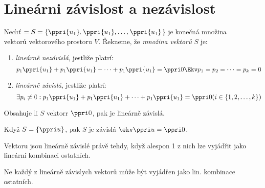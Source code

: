 
\let\braceru=\relax \let\bracelu=\relax 
\def\o#1{\setbox0=
	\hbox{$\kern2pt\overbrace{\kern-2pt#1\kern-2pt}\kern2pt$}\ht0=2.1ex\box0}
\def\to#1{\hbox{#1\rlap{\t{}}}}
\def\rad{\rm{rad}}
\def\f{\frac}
\BeginDoc{}
\section{Lineárni závislost a nezávislost}
\Def Nechť $=S = \{ \ppri{u_1},\ppri{u_1},\dots,\ppri{u_1}$\} je konečná množina vektorů vektorového prostoru $V$.
Řekneme, že \emph{množina vektorů} $S$ je:
\begin{enumerate}
	\item \emph{lineárně nezávislá}, jestliže platrí:
		$$ p_1 \* \ppri{u_1} + p_1 \* \ppri{u_1} + \cdots + p_1 \* \ppri{u_1} = \ppri 0 \Ekv p_1=p_2=\cdots=p_k = 0$$
	\item \emph{lineárně závislá}, jestliže platrí:
		$$\exists p_i\neq 0:  p_1 \* \ppri{u_1} + p_1 \* \ppri{u_1} + \cdots + p_1 \* \ppri{u_1}  = \ppri 0 ( i \in \{ 1,2,\dots,k\} ) $$
\end{enumerate}

\V Obsahuje li $S$ vektorr $\ppri 0$, pak je lineárně závislá.

Když $S = \{ \ppri u \}$, pak $S$ je závislá $\ekv \ppri u = \ppri 0$.

\V Vektoru jsou lineárně závislé právě tehdy, když alespon 1 z nich lze vyjádřit jako lineární kombinaci ostatních.

\Poz Ne každý z lineárně závislych vektorů může být vyjádřen jako lin. kombinace ostatních.




\EndDoc

